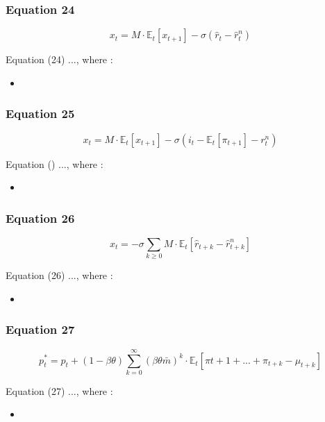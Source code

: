 \documentclass{article}
\begin{document}
\subsubsection*{Equation 24}
\begin{equation}
    x_{t}=M\cdot\mathbb{E}_{t}\left[x_{t+1}\right]-\sigma(\hat{r}_{t}-\hat{r}^{n}_{t})
\end{equation}

Equation (24) ..., where : 
\begin{itemize}
    \item 
\end{itemize}

\subsubsection*{Equation 25}
\begin{equation}
    x_{t}=M\cdot\mathbb{E}_{t}\left[x_{t+1}\right]-\sigma(i_{t}-\mathbb{E}_{t}\left[\pi_{t+1}\right]-r^{n}_{t})
\end{equation}

Equation () ..., where : 
\begin{itemize}
    \item 
\end{itemize}

\subsubsection*{Equation 26}
\begin{equation}
    x_{t}=-\sigma\sum_{k\geq 0}{M\cdot \mathbb{E}_{t}\left[\hat{r}_{t+k}-\hat{r}_{t+k}^{n}\right]}
\end{equation}

Equation (26) ..., where : 
\begin{itemize}
    \item 
\end{itemize}

\subsubsection*{Equation 27}
\begin{equation}
    p^{*}_{t}=p_{t}+(1-\beta\theta)\sum_{k=0}^{\infty}\left(\beta\theta\bar{m}\right)^{k}\cdot\mathbb{E}_{t}\left[\pi{t+1}+...+\pi_{t+k}-\mu_{t+k}\right]
\end{equation}

Equation (27) ..., where : 
\begin{itemize}
    \item 
\end{itemize}
\end{document}
